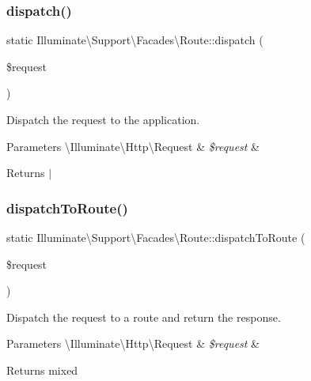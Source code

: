 \subsubsection{\texorpdfstring{dispatch()}{dispatch()}}
{\footnotesize\ttfamily static Illuminate\textbackslash{}\+Support\textbackslash{}\+Facades\textbackslash{}\+Route\+::dispatch (\begin{DoxyParamCaption}\item[{}]{\$request }\end{DoxyParamCaption})\hspace{0.3cm}{\ttfamily [static]}}

Dispatch the request to the application.


\begin{DoxyParams}[1]{Parameters}
\textbackslash{}\+Illuminate\textbackslash{}\+Http\textbackslash{}\+Request & {\em \$request} & \\
\hline
\end{DoxyParams}
\begin{DoxyReturn}{Returns}
$\vert$ 
\end{DoxyReturn}
\mbox{\label{class_illuminate_1_1_support_1_1_facades_1_1_route_a22e9a656dbe34e0311a566c90330a3a6}} 
\subsubsection{\texorpdfstring{dispatch\+To\+Route()}{dispatchToRoute()}}
{\footnotesize\ttfamily static Illuminate\textbackslash{}\+Support\textbackslash{}\+Facades\textbackslash{}\+Route\+::dispatch\+To\+Route (\begin{DoxyParamCaption}\item[{}]{\$request }\end{DoxyParamCaption})\hspace{0.3cm}{\ttfamily [static]}}

Dispatch the request to a route and return the response.


\begin{DoxyParams}[1]{Parameters}
\textbackslash{}\+Illuminate\textbackslash{}\+Http\textbackslash{}\+Request & {\em \$request} & \\
\hline
\end{DoxyParams}
\begin{DoxyReturn}{Returns}
mixed 
\end{DoxyReturn}
\mbox{\label{class_illuminate_1_1_support_1_1_facades_1_1_route_a3f0681b90b6ff2207c419498712a7ba4}} 
